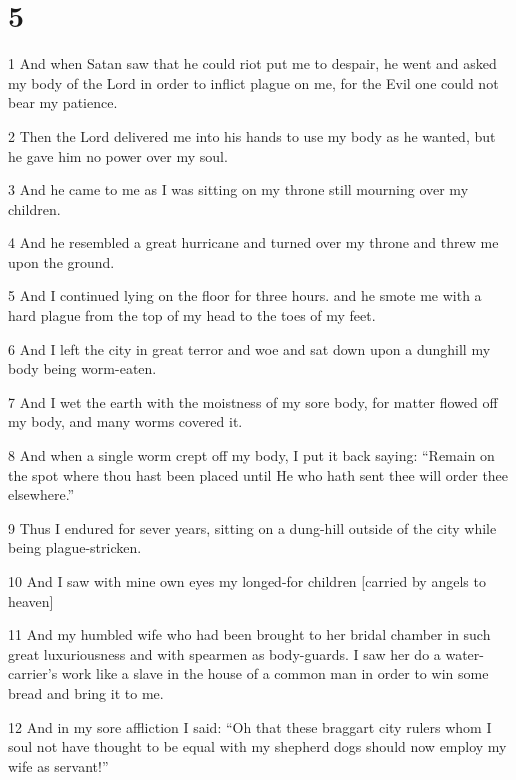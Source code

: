 \chapter{5}

\par 1 And when Satan saw that he could riot put me to despair, he went and asked my body of the Lord in order to inflict plague on me, for the Evil one could not bear my patience.

\par 2 Then the Lord delivered me into his hands to use my body as he wanted, but he gave him no power over my soul. 

\par 3 And he came to me as I was sitting on my throne still mourning over my children.

\par 4 And he resembled a great hurricane and turned over my throne and threw me upon the ground.

\par 5 And I continued lying on the floor for three hours. and he smote me with a hard plague from the top of my head to the toes of my feet.

\par 6 And I left the city in great terror and woe and sat down upon a dunghill my body being worm-eaten.

\par 7 And I wet the earth with the moistness of my sore body, for matter flowed off my body, and many worms covered it.

\par 8 And when a single worm crept off my body, I put it back saying: “Remain on the spot where thou hast been placed until He who hath sent thee will order thee elsewhere.”

\par 9 Thus I endured for sever years, sitting on a dung-hill outside of the city while being plague-stricken.

\par 10 And I saw with mine own eyes my longed-for children [carried by angels to heaven]

\par 11 And my humbled wife who had been brought to her bridal chamber in such great luxuriousness and with spearmen as body-guards. I saw her do a water-carrier's work like a slave in the house of a common man in order to win some bread and bring it to me.

\par 12 And in my sore affliction I said: “Oh that these braggart city rulers whom I soul not have thought to be equal with my shepherd dogs should now employ my wife as servant!”

